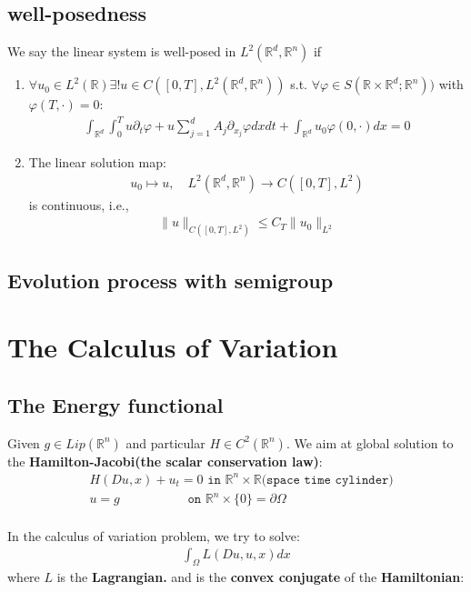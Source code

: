 \subsection{well-posedness}
\begin{definition}
	We say the linear system is well-posed in $L^2(\mathbb{R}^d, \mathbb{R}^n)$ if
	\begin{enumerate}
		\item $\forall u_0 \in L^2(\mathbb{R}) \exists ! u \in C([0, T], L^2(\mathbb{R}^d, \mathbb{R}^n))$ s.t. $\forall \varphi \in S(\mathbb{R} \times \mathbb{R}^d ; \mathbb{R}^n))$ with $\varphi(T, \cdot) = 0$:
		\begin{align*}
			\int_{\mathbb{R}^d}\int_0^T u \partial_t \varphi   +  u \sum_{j = 1}^d A_j \partial_{x_j} \varphi dx dt + \int_{\mathbb{R}^d} u_0 \varphi(0, \cdot) dx = 0
		\end{align*}
		\item The linear solution map:
		\begin{align*}
			u_0 \mapsto u, \quad L^2(\mathbb{R}^d, \mathbb{R}^n) \rightarrow C([0, T], L^2)
		\end{align*}
		is continuous, i.e., 
		\begin{align*}
			\|u\|_{C([0, T], L^2)} \le C_T \|u_0\|_{L^2}
		\end{align*}
	\end{enumerate}
\end{definition} 


\subsection{Evolution process with semigroup}

\section{The Calculus of Variation}

\subsection{The Energy functional}




Given $g \in Lip(\mathbb{R}^n)$ and particular $H \in C^2(\mathbb{R}^n)$. We aim at global solution to the \textbf{Hamilton-Jacobi(the scalar conservation law)}:
\begin{align*}
	&H(Du, x) + u_t = 0 \texttt{ in } \mathbb{R}^n \times \mathbb{R}(\texttt{space time cylinder)}\\
	&u = g \qquad \qquad \quad \texttt{ on } \mathbb{R}^n \times \{0\} = \partial\Omega
\end{align*}
\quad\\
In the calculus of variation problem, we try to solve:
\begin{align*}
	\int_\Omega L(Du, u, x) dx
\end{align*}
where $L$ is the \textbf{Lagrangian.} and is the  \textbf{convex conjugate} of the \textbf{Hamiltonian}:

